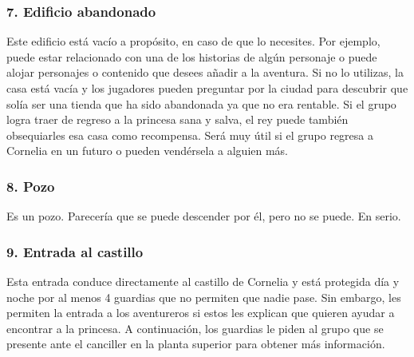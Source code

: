 \subsubsection*{7. Edificio abandonado}
Este edificio está vacío a propósito, en caso de que lo necesites. Por ejemplo, puede estar relacionado con una de los historias de algún personaje o puede alojar personajes o contenido que desees añadir a la aventura. Si no lo utilizas, la casa está vacía y los jugadores pueden preguntar por la ciudad para descubrir que solía ser una tienda que ha sido abandonada ya que no era rentable. Si el grupo logra traer de regreso a la princesa sana y salva, el rey puede también obsequiarles esa casa como recompensa. Será muy útil si el grupo regresa a Cornelia en un futuro o pueden vendérsela a alguien más. 

\subsubsection*{8. Pozo}
Es un pozo. Parecería que se puede descender por él, pero no se puede. En serio. 

\subsubsection*{9. Entrada al castillo}
Esta entrada conduce directamente al castillo de Cornelia y está protegida día y noche por al menos 4 guardias que no permiten que nadie pase. Sin embargo, les permiten la entrada a los aventureros si estos les explican que quieren ayudar a encontrar a la princesa. A continuación, los guardias le piden al grupo que se presente ante el canciller en la planta superior para obtener más información.

\pagebreak